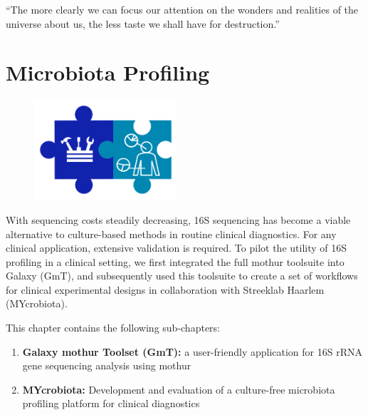 \cleartorightpage
\begin{savequote}[75mm]
“The more clearly we can focus our attention on the wonders and realities of the universe about us, the less taste we shall have for destruction.”
\end{savequote}

\chapter{Microbiota Profiling}\label{chapter:microbiota}
\setcounter{figure}{-1}
\setcounter{table}{-1}
\setcounter{section}{-1}

\begin{figure}[t!]
\includegraphics[height=10em]{frontmatter/images/chapter-header-microbiota-tools.png}
\end{figure}
\setcounter{figure}{-1}
\setcounter{table}{-1}
\setcounter{section}{-1}

With sequencing costs steadily decreasing, 16S sequencing has become a viable alternative to culture-based methods in routine clinical diagnostics. For any clinical application, extensive validation is required. To pilot the utility of 16S profiling in a clinical setting, we first integrated the full mothur toolsuite into Galaxy (GmT), and subsequently used this toolsuite to create a set of workflows for clinical experimental designs in collaboration with Streeklab Haarlem (MYcrobiota).

This chapter contains the following sub-chapters:

\begin{enumerate}[label=\ref{chapter:microbiota}.\arabic*]
\itemsep-0.5em
\setcounter{enumi}{-1}
\item \textbf{Galaxy mothur Toolset (GmT):} a user-friendly application for 16S rRNA gene sequencing analysis using mothur
\item \textbf{MYcrobiota:} Development and evaluation of a culture-free microbiota profiling platform for clinical diagnostics
\end{enumerate}


